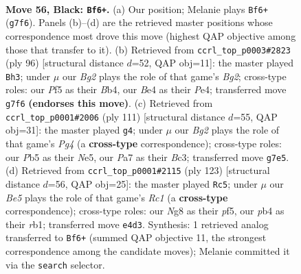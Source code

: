 \documentclass[11pt]{article}
\begin{document}
\clearpage

\begin{figure}[p]\centering
\begin{subfigure}{0.46\textwidth}\centering
\resizebox{\linewidth}{!}{%
\newchessgame
\chessboard[
  setfen={6n1/p5bk/P6p/Rp3p2/1P2bP1K/1R6/8/1Nr5 b - - 3 56},
  showmover=false,
  pgfstyle=straightmove, color=movearrow, markmove={g7-f6}
]}
\caption{}
\end{subfigure}\hfill
\begin{subfigure}{0.46\textwidth}\centering
\resizebox{\linewidth}{!}{%
\newchessgame
\chessboard[
  setfen={1nr4r/5k2/3Rpp2/1p2p3/1B2P3/8/1PP2NB1/6K1 w - - 3 49},
  showmover=false,
  pgfstyle=straightmove, color=movearrow, markmove={g2-h3}
]}
\caption{}
\end{subfigure}
\\[4pt]
\begin{subfigure}{0.46\textwidth}\centering
\resizebox{\linewidth}{!}{%
\newchessgame
\chessboard[
  setfen={8/8/r4k2/NR2nppp/Pp6/2b4P/4RPK1/8 b - - 3 56},
  showmover=false,
  pgfstyle=straightmove, color=movearrow, markmove={g5-g4}
]}
\caption{}
\end{subfigure}\hfill
\begin{subfigure}{0.46\textwidth}\centering
\resizebox{\linewidth}{!}{%
\newchessgame
\chessboard[
  setfen={2r2bk1/6p1/3p2P1/1R1N1P2/p2r4/P4K2/8/1R6 b - - 3 62},
  showmover=false,
  pgfstyle=straightmove, color=movearrow, markmove={c8-c5}
]}
\caption{}
\end{subfigure}
\caption{\textbf{Move 56, Black: \texttt{Bf6+}.} (a) Our position; Melanie plays \texttt{Bf6+} (\texttt{g7f6}). Panels (b)--(d) are the retrieved master positions whose correspondence most drove this move (highest QAP objective among those that transfer to it). (b) Retrieved from \texttt{ccrl\_top\_p0003\#2823} (ply 96) [structural distance $d$=52, QAP obj=11]: the master played \texttt{Bh3}; under $\mu$ our \emph{Bg2} plays the role of that game's \emph{Bg2}; cross-type roles: our \emph{P}f5 as their \emph{B}b4, our \emph{B}e4 as their \emph{P}e4; transferred move \texttt{g7f6} \textbf{(endorses this move)}. (c) Retrieved from \texttt{ccrl\_top\_p0001\#2006} (ply 111) [structural distance $d$=55, QAP obj=31]: the master played \texttt{g4}; under $\mu$ our \emph{Bg2} plays the role of that game's \emph{Pg4} (a \textbf{cross-type} correspondence); cross-type roles: our \emph{P}b5 as their \emph{N}e5, our \emph{P}a7 as their \emph{B}c3; transferred move \texttt{g7e5}. (d) Retrieved from \texttt{ccrl\_top\_p0001\#2115} (ply 123) [structural distance $d$=56, QAP obj=25]: the master played \texttt{Rc5}; under $\mu$ our \emph{Be5} plays the role of that game's \emph{Rc1} (a \textbf{cross-type} correspondence); cross-type roles: our \emph{N}g8 as their \emph{p}f5, our \emph{p}b4 as their \emph{r}b1; transferred move \texttt{e4d3}. Synthesis: 1 retrieved analog transferred to \texttt{Bf6+} (summed QAP objective 11, the strongest correspondence among the candidate moves); Melanie committed it via the \texttt{search} selector.}
\label{fig:thought-m111}
\end{figure}
\end{document}
